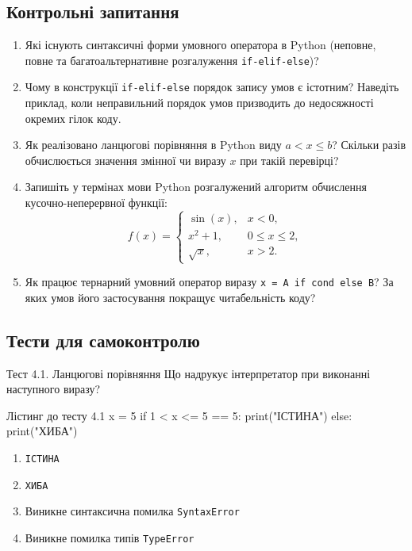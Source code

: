 \subsection*{Контрольні запитання}
\begin{enumerate}[label=\textbf{4.\arabic*.}]
	\item Які існують синтаксичні форми умовного оператора в Python (неповне, повне та багатоальтернативне розгалуження \texttt{if-elif-else})?
	\item Чому в конструкції \texttt{if-elif-else} порядок запису умов є істотним? Наведіть приклад, коли неправильний порядок умов призводить до недосяжності окремих гілок коду.
	\item Як реалізовано ланцюгові порівняння в Python виду $a < x \le b$? Скільки разів обчислюється значення змінної чи виразу $x$ при такій перевірці?
	\item Запишіть у термінах мови Python розгалужений алгоритм обчислення кусочно-неперервної функції:
	\[
	f(x) = \begin{cases}
		\sin(x), & x < 0, \\
		x^2 + 1, & 0 \le x \le 2, \\
		\sqrt{x}, & x > 2.
	\end{cases}
	\]
	\item Як працює тернарний умовний оператор виразу \texttt{x = A if cond else B}? За яких умов його застосування покращує читабельність коду?
\end{enumerate}

\subsection*{Тести для самоконтролю}

\begin{pr}{Тест 4.1. Ланцюгові порівняння}
Що надрукує інтерпретатор при виконанні наступного виразу?
\begin{py}{Лістинг до тесту 4.1}
x = 5
if 1 < x <= 5 == 5:
    print("ІСТИНА")
else:
    print("ХИБА")
\end{py}
\begin{enumerate}[label=\textbf{\Alph*.}]
	\item \texttt{ІСТИНА}
	\item \texttt{ХИБА}
	\item Виникне синтаксична помилка \texttt{SyntaxError}
	\item Виникне помилка типів \texttt{TypeError}
\end{enumerate}
\end{pr}

